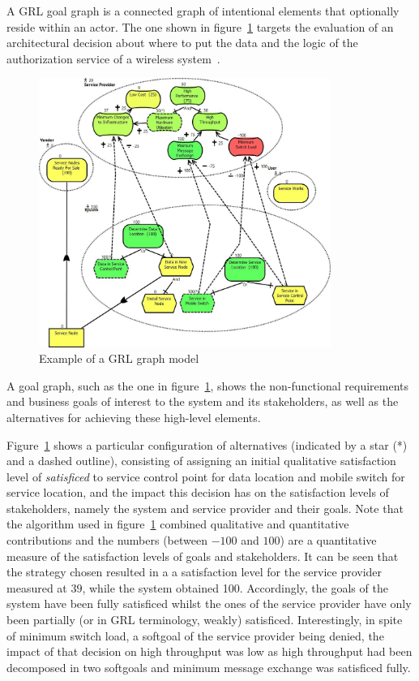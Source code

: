 \documentclass[dissertation,final]{softeng}
\begin{document}
A GRL goal graph is a connected graph of intentional elements that optionally reside within an actor. The one shown in figure~\ref{fig:WirelessIN_Integrated_GRLGraph} targets the evaluation of an architectural decision about where to put the data and the logic of the authorization service of a wireless system~\citep{amyot2011user}.

\begin{figure}[h]
\includegraphics[width=0.85\textwidth]{WirelessIN-Integrated-GRLGraph}
\centering
\caption[Example of a GRL graph model]{Example of a GRL graph model~\citep{amyot2011user}}
\label{fig:WirelessIN_Integrated_GRLGraph}
\end{figure}

A goal graph, such as the one in figure~\ref{fig:WirelessIN_Integrated_GRLGraph}, shows the non-functional requirements and business goals of interest to the system and its stakeholders, as well as the alternatives for achieving these high-level elements. 

Figure~\ref{fig:WirelessIN_Integrated_GRLGraph} shows a particular configuration of alternatives (indicated by a star (*) and a dashed outline), consisting of assigning an initial qualitative satisfaction level of \emph{satisficed} to service control point for data location and mobile switch for service location, and the impact this decision has on the satisfaction levels of stakeholders, namely the system and service provider and their goals. Note that the algorithm used in figure~\ref{fig:WirelessIN_Integrated_GRLGraph} combined qualitative and quantitative contributions and the numbers (between $-100$ and $100$) are a quantitative measure of the satisfaction levels of goals and stakeholders. It can be seen that the strategy chosen resulted in a a satisfaction level for the service provider measured at $39$, while the system obtained 100. Accordingly, the goals of the system have been fully satisficed whilst the ones of the service provider have only been partially (or in GRL terminology, weakly) satisficed. Interestingly, in spite of minimum switch load, a softgoal of the service provider being denied, the impact of that decision on high throughput was low as high throughput had been decomposed in two softgoals and minimum message exchange was satisficed fully. 
\end{document}
